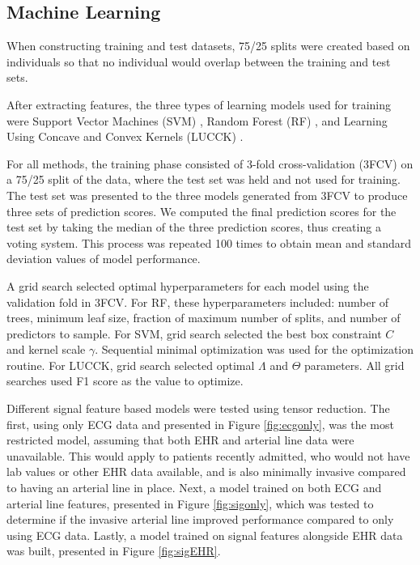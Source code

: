 \subsection*{Machine Learning} \label{sec:methods_ml}
When constructing training and test datasets, 75/25 splits were created based on individuals so that no individual would overlap between the training and test sets.

After extracting features, the three types of learning models used for training were Support Vector Machines (SVM) \autocite{cortes_support-vector_1995}, Random Forest (RF) \autocite{breiman_random_2001}, and Learning Using Concave and Convex Kernels (LUCCK) \autocite{sabeti_learning_2019}.

For all methods, the training phase consisted of 3-fold cross-validation (3FCV) on a 75/25 split of the data, where the test set was held and not used for training. The test set was presented to the three models generated from 3FCV to produce three sets of prediction scores. We computed the final prediction scores for the test set by taking the median of the three prediction scores, thus creating a voting system. This process was repeated 100 times to obtain mean and standard deviation values of model performance. 

A grid search selected optimal hyperparameters for each model using the validation fold in 3FCV. For RF, these hyperparameters included: number of trees, minimum leaf size, fraction of maximum number of splits, and number of predictors to sample. For SVM, grid search selected the best box constraint $C$ and kernel scale $\gamma$. Sequential minimal optimization \autocite{JMLR:v6:fan05a} was used for the optimization routine. For LUCCK, grid search selected optimal $\Lambda$ and $\Theta$ parameters. All grid searches used F1 score as the value to optimize. 

Different signal feature based models were tested using tensor reduction. The first, using only ECG data and presented in Figure \ref{fig:ecgonly}, was the most restricted model, assuming that both EHR and arterial line data were unavailable. This would apply to patients recently admitted, who would not have lab values or other EHR data available, and is also minimally invasive compared to having an arterial line in place. Next, a model trained on both ECG and arterial line features, presented in Figure \ref{fig:sigonly}, which was tested to determine if the invasive arterial line improved performance compared to only using ECG data. Lastly, a model trained on signal features alongside EHR data was built, presented in Figure \ref{fig:sigEHR}.

